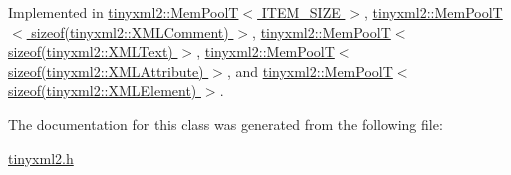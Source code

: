 Implemented in \hyperlink{classtinyxml2_1_1_mem_pool_t_aee3c611215ae08cce41a940bf2763027}{tinyxml2\+::\+Mem\+Pool\+T$<$ I\+T\+E\+M\+\_\+\+S\+I\+Z\+E $>$}, \hyperlink{classtinyxml2_1_1_mem_pool_t_aee3c611215ae08cce41a940bf2763027}{tinyxml2\+::\+Mem\+Pool\+T$<$ sizeof(tinyxml2\+::\+X\+M\+L\+Comment) $>$}, \hyperlink{classtinyxml2_1_1_mem_pool_t_aee3c611215ae08cce41a940bf2763027}{tinyxml2\+::\+Mem\+Pool\+T$<$ sizeof(tinyxml2\+::\+X\+M\+L\+Text) $>$}, \hyperlink{classtinyxml2_1_1_mem_pool_t_aee3c611215ae08cce41a940bf2763027}{tinyxml2\+::\+Mem\+Pool\+T$<$ sizeof(tinyxml2\+::\+X\+M\+L\+Attribute) $>$}, and \hyperlink{classtinyxml2_1_1_mem_pool_t_aee3c611215ae08cce41a940bf2763027}{tinyxml2\+::\+Mem\+Pool\+T$<$ sizeof(tinyxml2\+::\+X\+M\+L\+Element) $>$}.



The documentation for this class was generated from the following file\+:\begin{DoxyCompactItemize}
\item 
\hyperlink{tinyxml2_8h}{tinyxml2.\+h}\end{DoxyCompactItemize}
